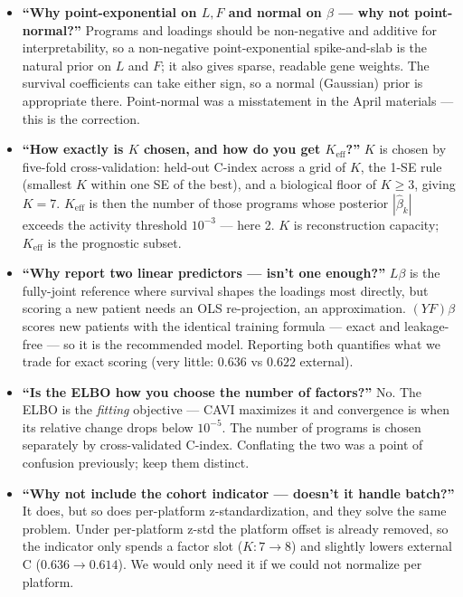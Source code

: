 \documentclass[11pt]{article}
\newcommand{\sectionlabel}[1]{\textbf{#1}}
\begin{document}
\begin{itemize}
\item \sectionlabel{``Why point-exponential on $L,F$ and normal on $\beta$ --- why not point-normal?''}
Programs and loadings should be non-negative and additive for interpretability, so a non-negative
point-exponential spike-and-slab is the natural prior on $L$ and $F$; it also gives sparse, readable
gene weights. The survival coefficients can take either sign, so a normal (Gaussian) prior is
appropriate there. Point-normal was a misstatement in the April materials --- this is the correction.

\item \sectionlabel{``How exactly is $K$ chosen, and how do you get $K_{\text{eff}}$?''} $K$ is chosen
by five-fold cross-validation: held-out C-index across a grid of $K$, the 1-SE rule (smallest $K$
within one SE of the best), and a biological floor of $K \ge 3$, giving $K = 7$. $K_{\text{eff}}$ is
then the number of those programs whose posterior $|\hat\beta_k|$ exceeds the activity threshold
$10^{-3}$ --- here 2. $K$ is reconstruction capacity; $K_{\text{eff}}$ is the prognostic subset.

\item \sectionlabel{``Why report two linear predictors --- isn't one enough?''} $L\beta$ is the
fully-joint reference where survival shapes the loadings most directly, but scoring a new patient
needs an OLS re-projection, an approximation. $(YF)\beta$ scores new patients with the identical
training formula --- exact and leakage-free --- so it is the recommended model. Reporting both
quantifies what we trade for exact scoring (very little: $0.636$ vs $0.622$ external).

\item \sectionlabel{``Is the ELBO how you choose the number of factors?''} No. The ELBO is the
\emph{fitting} objective --- CAVI maximizes it and convergence is when its relative change drops below
$10^{-5}$. The number of programs is chosen separately by cross-validated C-index. Conflating the two
was a point of confusion previously; keep them distinct.

\item \sectionlabel{``Why not include the cohort indicator --- doesn't it handle batch?''} It does, but
so does per-platform z-standardization, and they solve the same problem. Under per-platform z-std the
platform offset is already removed, so the indicator only spends a factor slot ($K: 7 \to 8$) and
slightly lowers external C ($0.636 \to 0.614$). We would only need it if we could not normalize per
platform.


\end{itemize}
\end{document}
